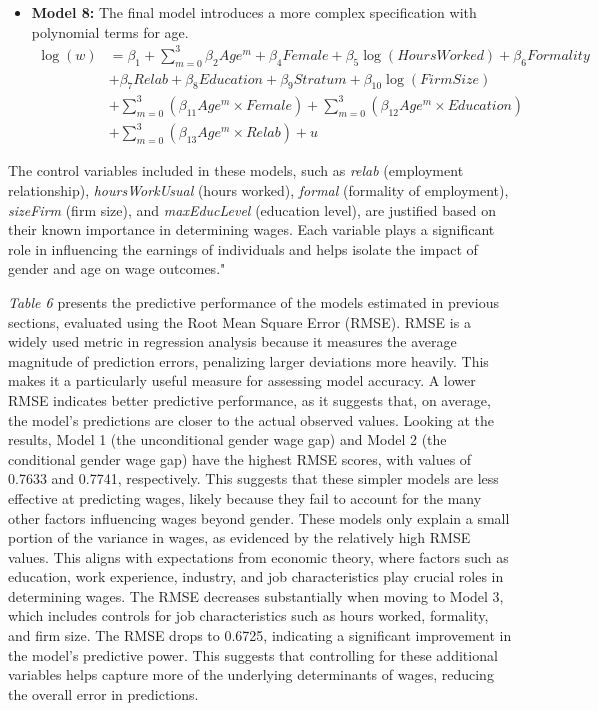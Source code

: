 \documentclass[11pt,a4paper,onecolumn]{article}
\begin{document}
\begin{itemize}
            \item \textbf{Model 8:} The final model introduces a more complex specification with polynomial terms for age.
            \begin{align*}
            \log(w) &= \beta_1 + \sum_{m=0}^{3} \beta_2 Age^m + \beta_4 Female + \beta_5 \log(HoursWorked) + \beta_6 Formality \\ &+ \beta_7 Relab + \beta_8 Education + \beta_9 Stratum + \beta_{10} \log(FirmSize) \\ &+ \sum_{m=0}^{3} (\beta_{11} Age^m \times Female) + \sum_{m=0}^{3} (\beta_{12} Age^m \times Education) \\ &+ \sum_{m=0}^{3} (\beta_{13} Age^m \times Relab) + u \tag{8}
            \end{align*}
        \end{itemize}

        
        The control variables included in these models, such as \textit{relab} (employment relationship), \textit{hoursWorkUsual} (hours worked), \textit{formal} (formality of employment), \textit{sizeFirm} (firm size), and \textit{maxEducLevel} (education level), are justified based on their known importance in determining wages. Each variable plays a significant role in influencing the earnings of individuals and helps isolate the impact of gender and age on wage outcomes."



        \textit{Table 6} presents the predictive performance of the models estimated in previous sections, evaluated using the Root Mean Square Error (RMSE). RMSE is a widely used metric in regression analysis because it measures the average magnitude of prediction errors, penalizing larger deviations more heavily. This makes it a particularly useful measure for assessing model accuracy. A lower RMSE indicates better predictive performance, as it suggests that, on average, the model’s predictions are closer to the actual observed values. Looking at the results, Model 1 (the unconditional gender wage gap) and Model 2 (the conditional gender wage gap) have the highest RMSE scores, with values of 0.7633 and 0.7741, respectively. This suggests that these simpler models are less effective at predicting wages, likely because they fail to account for the many other factors influencing wages beyond gender. These models only explain a small portion of the variance in wages, as evidenced by the relatively high RMSE values. This aligns with expectations from economic theory, where factors such as education, work experience, industry, and job characteristics play crucial roles in determining wages. The RMSE decreases substantially when moving to Model 3, which includes controls for job characteristics such as hours worked, formality, and firm size. The RMSE drops to 0.6725, indicating a significant improvement in the model's predictive power. This suggests that controlling for these additional variables helps capture more of the underlying determinants of wages, reducing the overall error in predictions.
        
\end{document}
